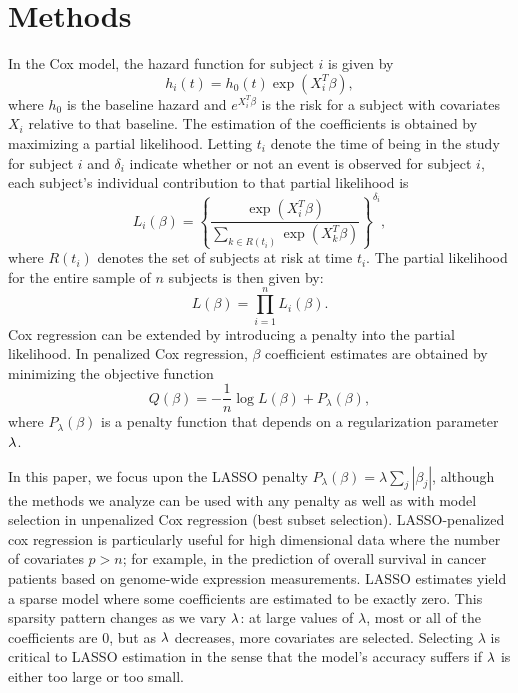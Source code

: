 \section{Methods}
\label{Sec:methods}

\par In the Cox model, the hazard function for subject $i$ is given by 
\begin{equation*}
  h_{i}(t) = h_{0}(t) \exp( X_{i}^{T} \beta),
\end{equation*} 
where $h_{0}$ is the baseline hazard and $e^{X_i^{T} \beta}$ is the risk for a subject with covariates $X_i$ relative to that baseline.  The estimation of the coefficients is obtained by maximizing a partial likelihood.  Letting $t_i$ denote the time of being in the study for subject $i$ and $\delta_{i}$ indicate whether or not an event is observed for subject $i$, each subject's individual contribution to that partial likelihood is
\begin{equation}
  \label{eq:cox-pl-subj}
  L_{i}(\beta) = \left \{\frac{\exp ( X_{i}^{T} \beta)}{\sum_{ k \in R(t_{i})}\exp ( X_{k}^{T} \beta)}\right \}^{\delta_{i}},
\end{equation}
where $R(t_{i})$ denotes the set of subjects at risk at time $t_{i}$.  The partial likelihood for the entire sample of $n$ subjects is then given by:
\begin{equation}
  \label{eq:cox-pl-sum}
  L(\beta) =\prod_{i = 1}^{n} L_{i}(\beta).
\end{equation}
Cox regression can be extended by introducing a penalty into the partial likelihood.  In penalized Cox regression, $\beta$ coefficient estimates are obtained by minimizing the objective function
\begin{equation}
  \label{eq:obj}
  Q(\beta) = - \frac{1}{n} \log L(\beta) + P_{\lambda}(\beta),
\end{equation}
where $P_{\lambda}(\beta)$ is a penalty function that depends on a regularization parameter $\lambda$.

\par In this paper, we focus upon the LASSO penalty $P_{\lambda}(\beta) = \lambda \sum_{j} |\beta_{j}|$, although the methods we analyze can be used with any penalty as well as with model selection in unpenalized Cox regression (best subset selection). LASSO-penalized cox regression is particularly useful for high dimensional data where the number of covariates $p > n$; for example, in the prediction of overall survival in cancer patients based on genome-wide expression measurements. LASSO estimates yield a sparse model where some coefficients are estimated to be exactly zero. This sparsity pattern changes as we vary $\lambda$: at large values of $\lambda$, most or all of the coefficients are 0, but as $\lambda$ decreases, more covariates are selected. Selecting $\lambda$ is critical to LASSO estimation in the sense that the model's accuracy suffers if $\lambda$ is either too large or too small.

